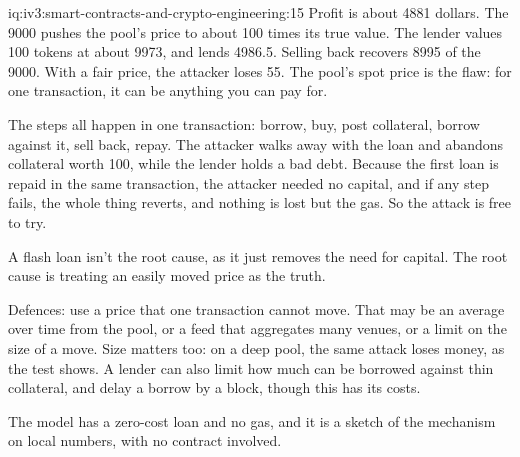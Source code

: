 \begin{solution}{iq:iv3:smart-contracts-and-crypto-engineering:15}
Profit is about 4881 dollars. The 9000 pushes the pool's price to about 100 times its true value. The lender values 100 tokens at about 9973, and lends 4986.5. Selling back recovers 8995 of the 9000. With a fair price, the attacker loses 55. The pool's spot price is the flaw: for one transaction, it can be anything you can pay for.
\label{lst:iv3:cr:oracle}

The steps all happen in one transaction: borrow, buy, post collateral, borrow against it, sell back, repay. The attacker walks away with the loan and abandons collateral worth 100, while the lender holds a bad debt. Because the first loan is repaid in the same transaction, the attacker needed no capital, and if any step fails, the whole thing reverts, and nothing is lost but the gas. So the attack is free to try.

A flash loan isn't the root cause, as it just removes the need for capital. The root cause is treating an easily moved price as the truth.

Defences: use a price that one transaction cannot move. That may be an average over time from the pool, or a feed that aggregates many venues, or a limit on the size of a move. Size matters too: on a deep pool, the same attack loses money, as the test shows. A lender can also limit how much can be borrowed against thin collateral, and delay a borrow by a block, though this has its costs.

The model has a zero-cost loan and no gas, and it is a sketch of the mechanism on local numbers, with no contract involved.

\end{solution}

